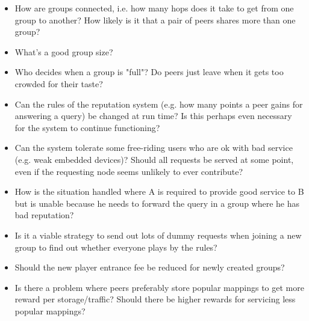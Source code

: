 \documentclass[10pt]{article}
\begin{document}
\begin{itemize}
\item How are groups connected, i.e. how many hops does it take to get from one
      group to another? How likely is it that a pair of peers shares more than
      one group?
\item What's a good group size?
\item Who decides when a group is "full"? Do peers just leave when it gets too
      crowded for their taste?
\item Can the rules of the reputation system (e.g. how many points a peer gains
      for answering a query) be changed at run time? Is this perhaps even
      necessary for the system to continue functioning?
\item Can the system tolerate some free-riding users who are ok with bad service
      (e.g. weak embedded devices)? Should all requests be served at some point,
      even if the requesting node seems unlikely to ever contribute?
\item How is the situation handled where A is required to provide good service
      to B but is unable because he needs to forward the query in a group where
      he has bad reputation?
\item Is it a viable strategy to send out lots of dummy requests when joining a
      new group to find out whether everyone plays by the rules?
\item Should the new player entrance fee be reduced for newly created groups?
\item Is there a problem where peers preferably store popular mappings to get
      more reward per storage/traffic? Should there be higher rewards for
      servicing less popular mappings?
\end{itemize}

{}

\end{document}
